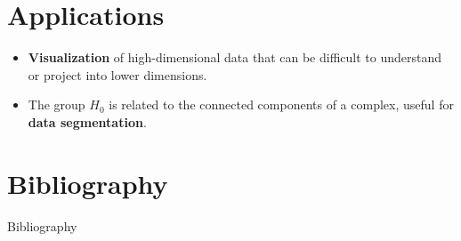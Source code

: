 \section{Applications}
\begin{frame}
	\begin{itemize}
		\item \textbf{Visualization} of high-dimensional data that can be difficult to understand or project into lower dimensions.
		\item The group \(H_0\) is related to the connected components of a complex, useful for \textbf{data segmentation}.
	\end{itemize}
\end{frame}

\section*{Bibliography}
\begin{frame}{Bibliography}
	\nocite{wagner}
	\nocite{hatcher}
	\nocite{fraleigha}
	\begingroup
	\renewcommand{\section}[2]{}%
	
	\endgroup
\end{frame}





